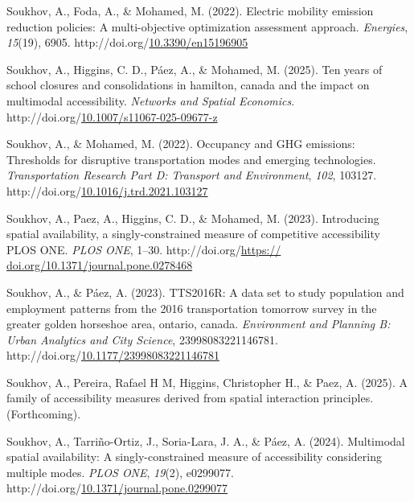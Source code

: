 \documentclass[
11pt, %
oneside, %
english, %
singlespacing, %
]{macthesis} %
\newlength{\cslhangindent}
\newenvironment{CSLReferences}[2] %
{\begin{list}{}{%
	\setlength{\itemindent}{0pt}
	\setlength{\leftmargin}{0pt}
	\setlength{\parsep}{0pt}
	\ifodd #1
	\setlength{\leftmargin}{\cslhangindent}
	\setlength{\itemindent}{-1\cslhangindent}
	\fi
	\setlength{\itemsep}{#2\baselineskip}}}
{\end{list}}
\begin{document}
\begin{CSLReferences}{1}{0}
Soukhov, A., Foda, A., \& Mohamed, M. (2022). Electric mobility emission reduction policies: A multi-objective optimization assessment approach. \emph{Energies}, \emph{15}(19), 6905. http://doi.org/\href{https://doi.org/10.3390/en15196905}{10.3390/en15196905}

Soukhov, A., Higgins, C. D., Páez, A., \& Mohamed, M. (2025). Ten years of school closures and consolidations in hamilton, canada and the impact on multimodal accessibility. \emph{Networks and Spatial Economics}. http://doi.org/\href{https://doi.org/10.1007/s11067-025-09677-z}{10.1007/s11067-025-09677-z}

Soukhov, A., \& Mohamed, M. (2022). Occupancy and {GHG} emissions: Thresholds for disruptive transportation modes and emerging technologies. \emph{Transportation Research Part D: Transport and Environment}, \emph{102}, 103127. http://doi.org/\href{https://doi.org/10.1016/j.trd.2021.103127}{10.1016/j.trd.2021.103127}

Soukhov, A., Paez, A., Higgins, C. D., \& Mohamed, M. (2023). Introducing spatial availability, a singly-constrained measure of competitive accessibility {\textbar} {PLOS} {ONE}. \emph{{PLOS} {ONE}}, 1--30. http://doi.org/\href{https://\%20doi.org/10.1371/journal.pone.0278468}{https:// doi.org/10.1371/journal.pone.0278468}

Soukhov, A., \& Páez, A. (2023). {TTS}2016R: A data set to study population and employment patterns from the 2016 transportation tomorrow survey in the greater golden horseshoe area, ontario, canada. \emph{Environment and Planning B: Urban Analytics and City Science}, 23998083221146781. http://doi.org/\href{https://doi.org/10.1177/23998083221146781}{10.1177/23998083221146781}

Soukhov, A., Pereira, Rafael H M, Higgins, Christopher H., \& Paez, A. (2025). A family of accessibility measures derived from spatial interaction principles. (Forthcoming).

Soukhov, A., Tarriño-Ortiz, J., Soria-Lara, J. A., \& Páez, A. (2024). Multimodal spatial availability: A singly-constrained measure of accessibility considering multiple modes. \emph{{PLOS} {ONE}}, \emph{19}(2), e0299077. http://doi.org/\href{https://doi.org/10.1371/journal.pone.0299077}{10.1371/journal.pone.0299077}


\end{CSLReferences}
\end{document}
